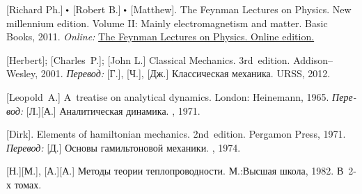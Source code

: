 \begin{thebibliography}{123}
\begin{otherlanguage}{russian}
[Richard Ph.] ${\hspace{-0.2ex}\bigdot}$ [Robert B.] ${\hspace{-0.2ex}\bigdot}$ [Matthew]. The Feynman Lectures on Physics. New millennium edition. Volume II: Mainly electromagnetism and matter. Basic Books, 2011. 
\emph{Online:}
\href{http://www.feynmanlectures.caltech.edu/}{The Feynman Lectures on Physics. Online edition.}

%

[Herbert]; [Charles~P.]; [John L.] Classical Mechanics. 3rd~edition. Addison\hbox{--}Wesley, 2001. 
\emph{Перевод:} [Г.], [Ч.], [Дж.] Классическая механика. URSS, 2012. 


[Leopold~A.] A~treatise on analytical dynamics.
London: Heinemann, 1965. 
\emph{Перевод:} [Л.][А.] Аналитическая динамика. \naukapublisher, 1971. 

[Dirk]. Elements of hamiltonian mechanics. 2nd~edition. Pergamon Press, 1971. 
\emph{Перевод:} [Д.] Основы гамильтоновой механики. \naukapublisher, 1974. 

[Н.][М.], [А.][А.] Методы теории теплопроводности. М.:\;Высшая школа, 1982. В~2\hbox{-}х томах.


\end{otherlanguage}
\end{thebibliography}

